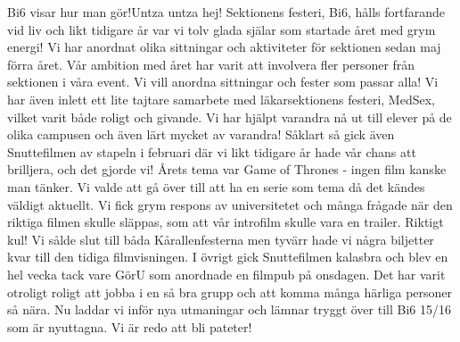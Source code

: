 \begin{news}{3}{Bi6 visar hur man gör!}{Untza untza hej!}{}{}
Sektionens festeri, Bi6, hålls fortfarande vid liv och likt tidigare år var
vi tolv glada själar som startade året med grym energi! Vi har anordnat olika
sittningar och aktiviteter för sektionen sedan maj förra året. Vår ambition med
året har varit att involvera fler personer från sektionen i våra event. Vi vill
anordna sittningar och fester som passar alla! Vi har även inlett ett lite
tajtare samarbete med läkarsektionens festeri, MedSex, vilket varit både roligt
och givande. Vi har hjälpt varandra nå ut till elever på de olika campusen och
även lärt mycket av varandra! Såklart så gick även Snuttefilmen av stapeln i
februari där vi likt tidigare år hade vår chans att brilljera, och det gjorde
vi! Årets tema var Game of Thrones - ingen film kanske man tänker. Vi valde att
gå över till att ha en serie som tema då det kändes väldigt aktuellt. Vi fick
grym respons av universitetet och många frågade när den riktiga filmen skulle
släppas, som att vår introfilm skulle vara en trailer. Riktigt kul! Vi sålde
slut till båda Kårallenfesterna men tyvärr hade vi några biljetter kvar till
den tidiga filmvisningen. I övrigt gick Snuttefilmen kalasbra och blev en hel
vecka tack vare GörU som anordnade en filmpub på onsdagen. Det har varit
otroligt roligt att jobba i en så bra grupp och att komma många härliga
personer så nära. Nu laddar vi inför nya utmaningar och lämnar tryggt över till
Bi6 15/16 som är nyuttagna. Vi är redo att bli pateter!

\end{news}
